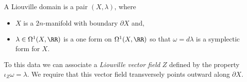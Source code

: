 
 
    A Liouville domain is a pair $(X,\lambda)$, where
    \begin{itemize}
       \item $X$ is a $2n$-manifold with boundary $\partial X$ and,
       \item $\lambda\in \Omega^1(X, \RR)$ is a one form on $\Omega^1(X, \RR)$ so that $\omega=d\lambda$ is a symplectic form for $X$.
    \end{itemize}
 To this data we can associate a \emph{Liouville vector field} $Z$ defined by the property $\iota_Z\omega= \lambda$.
 We require that this vector field transversely points outward along $\partial X$.
 \label{def:liouvilleDomain}
 